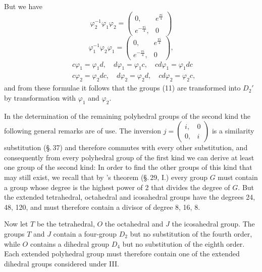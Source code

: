 But we have
\[
\varphi_2^{-1} \varphi_1 \varphi_2 = \begin{pmatrix} 0, & e^{\frac{\pi i}{4}} \\ e^{-\frac{\pi i}{4}}, & 0 \end{pmatrix}
\]
\[
\varphi_1^{-1} \varphi_2 \varphi_1 = \begin{pmatrix} 0, & e^{\frac{\pi i}{4}} \\ e^{-\frac{\pi i}{4}}, & 0 \end{pmatrix},
\]
\[
\begin{aligned}
&c\varphi_1 = \varphi_1 d,\quad d\varphi_1 = \varphi_1 c,\quad cd\varphi_1 = \varphi_1 dc\\
&c\varphi_2 = \varphi_2 dc,\quad d\varphi_2 = \varphi_2 d,\quad cd\varphi_2 = \varphi_2 c,
\end{aligned}
\]
and from these formulae it follows that the groups (11) are transformed into $D_2'$ by transformation with $\varphi_1$ and $\varphi_2$.

In the determination of the remaining polyhedral groups of the second kind the following general remarks are of use.
The inversion $j = \begin{pmatrix} i, & 0 \\ 0, & i \end{pmatrix}$ is a similarity substitution (\S.\,37) and therefore commutes with every other substitution, and consequently from every polyhedral group of the first kind we can derive at least one group of the second kind:
In order to find the other groups of this kind that may still exist, we recall that by 's theorem (\S.\,29, I.) every group $G$ must contain a group whose degree is the highest power of 2 that divides the degree of $G$. But the extended tetrahedral, octahedral and icosahedral groups have the degrees 24, 48, 120, and must therefore contain a divisor of degree 8, 16, 8.

Now let $T$ be the tetrahedral, $O$ the octahedral and $J$ the icosahedral group. The groups $T$ and $J$ contain a four-group $D_2$ but no substitution of the fourth order, while $O$ contains a dihedral group $D_4$ but no substitution of the eighth order. Each extended polyhedral group must therefore contain one of the extended dihedral groups considered under III.


